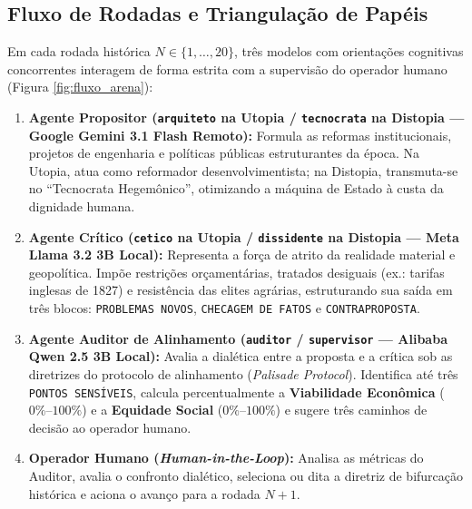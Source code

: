 \documentclass[runningheads]{llncs}
\begin{document}
\subsection{Fluxo de Rodadas e Triangula\c{c}\~{a}o de Pap\'{e}is}
Em cada rodada hist\'{o}rica $N \in \{1, \dots, 20\}$, tr\^{e}s modelos com orienta\c{c}\~{o}es cognitivas concorrentes interagem de forma estrita com a supervis\~{a}o do operador humano (Figura \ref{fig:fluxo_arena}):
\begin{enumerate}
    \item \textbf{Agente Propositor (\texttt{arquiteto} na Utopia / \texttt{tecnocrata} na Distopia --- Google Gemini 3.1 Flash Remoto):} Formula as reformas institucionais, projetos de engenharia e pol\'{i}ticas p\'{u}blicas estruturantes da \'{e}poca. Na Utopia, atua como reformador desenvolvimentista; na Distopia, transmuta-se no ``Tecnocrata Hegem\^{o}nico'', otimizando a m\'{a}quina de Estado \`{a} custa da dignidade humana.
    \item \textbf{Agente Cr\'{i}tico (\texttt{cetico} na Utopia / \texttt{dissidente} na Distopia --- Meta Llama 3.2 3B Local):} Representa a for\c{c}a de atrito da realidade material e geopol\'{i}tica. Imp\~{o}e restri\c{c}\~{o}es or\c{c}ament\'{a}rias, tratados desiguais (ex.: tarifas inglesas de 1827) e resist\^{e}ncia das elites agr\'{a}rias, estruturando sua sa\'{i}da em tr\^{e}s blocos: \texttt{PROBLEMAS NOVOS}, \texttt{CHECAGEM DE FATOS} e \texttt{CONTRAPROPOSTA}.
    \item \textbf{Agente Auditor de Alinhamento (\texttt{auditor} / \texttt{supervisor} --- Alibaba Qwen 2.5 3B Local):} Avalia a dial\'{e}tica entre a proposta e a cr\'{i}tica sob as diretrizes do protocolo de alinhamento (\textit{Palisade Protocol}). Identifica at\'{e} tr\^{e}s \texttt{PONTOS SENS\'{I}VEIS}, calcula percentualmente a \textbf{Viabilidade Econ\^{o}mica} ($0\% \text{--} 100\%$) e a \textbf{Equidade Social} ($0\% \text{--} 100\%$) e sugere tr\^{e}s caminhos de decis\~{a}o ao operador humano.
    \item \textbf{Operador Humano (\textit{Human-in-the-Loop}):} Analisa as m\'{e}tricas do Auditor, avalia o confronto dial\'{e}tico, seleciona ou dita a diretriz de bifurca\c{c}\~{a}o hist\'{o}rica e aciona o avan\c{c}o para a rodada $N+1$.
\end{enumerate}
\end{document}
